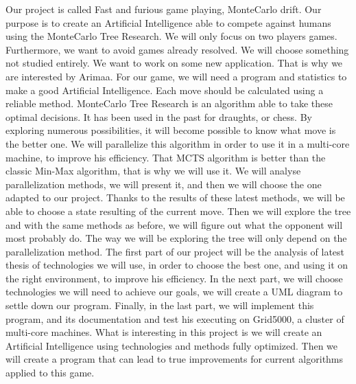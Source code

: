 
Our project is called Fast and furious game playing, MonteCarlo drift. Our purpose is to create an Artificial Intelligence able to compete against humans using the MonteCarlo Tree Research.
\newline
We will only focus on two players games. Furthermore, we want to avoid games already resolved. We will choose something not studied entirely. We want to work on some new application. That is why we are interested by Arimaa.
\newline
\newline
For our game, we will need a program and statistics to make a good Artificial Intelligence. Each move should be calculated using a reliable method.
MonteCarlo Tree Research is an algorithm able to take these optimal decisions. It has been used in the past for draughts, or chess. By exploring numerous possibilities, it will become possible to know what move is the better one.
We will parallelize this algorithm in order to use it in a multi-core machine, to improve his efficiency.
That MCTS algorithm is better than the classic Min-Max algorithm, that is why we will use it.
\newline
\newline
We will analyse parallelization methods, we will present it, and then we will choose the one adapted to our project.
Thanks to the results of these latest methods, we will be able to choose a state resulting of the current move. Then we will explore the tree and with the same methods as before, we will figure out what the opponent will most probably do. The way we will be exploring the tree will only depend on the parallelization method.
The first part of our project will be the analysis of latest thesis of technologies we will use, in order to choose the best one, and using it on the right environment, to improve his  efficiency.
In the next part, we will choose technologies we will need to achieve our goals, we will create a UML diagram to settle down our program.
\newline
\newline
Finally, in the last part, we will implement this program, and its documentation and test his executing on Grid5000, a cluster of multi-core machines.
What is interesting in this project is we will create an Artificial Intelligence using technologies and methods fully optimized. Then we will create a program that can lead to true improvements for current algorithms applied to this game.


